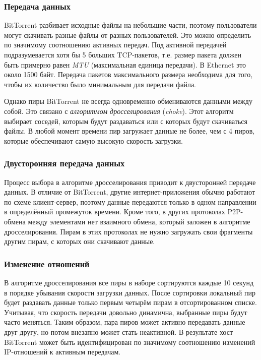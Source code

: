 \documentclass[bachelor, och, coursework]{SCWorks}
\begin{document}
\subsubsection{Передача данных}
BitTorrent разбивает исходные файлы на небольшие части, поэтому пользователи могут скачивать разные файлы
от разных пользователей. Это можно определить по значимому соотношению активных передач. Под активной передачей
подразумевается хотя бы 5 больших TCP-пакетов, т.е. размер пакета должен быть примерно равен \textit{MTU} (максимальная единица передачи). В Ethernet это около 1500 байт. Передача пакетов максимального размера необходима для того, 
чтобы их количество было минимальным для передачи файла.

Однако пиры BitTorrent не всегда одновременно обмениваются данными между собой. 
Это связано с \textit{алгоритмом дросселирования} (\textit{choke}). Этот алгоритм выбирает соседей, которым будут раздаваться или с которых будут скачиваться файлы. В любой момент времени пир загружает данные не более, чем 
с 4 пиров, которые обеспечивают самую высокую скорость загрузки. %
 
\subsubsection{Двусторонняя передача данных}
Процесс выбора в алгоритме дросселирования приводит к двусторонней передаче данных. В отличие от BitTorrent, другие 
интернет-приложения обычно работают по схеме клиент-сервер, поэтому данные передаются только в одном направлении в 
определённый промежуток времени. Кроме того, в других протоколах P2P-обмена между элементами нет взаимного обмена,
который заложен в алгоритме дросселирования. Пирам в этих протоколах не нужно загружать свои фрагменты другим пирам,
с которых они скачивают данные. 

\subsubsection{Изменение отношений}
В алгоритме дросселирования все пиры в наборе сортируются каждые 10 секунд в порядке убывания скорости загрузки данных.
После сортировки локальный пир будет раздавать данные только первым четырём пирам в отсортированном списке.
Учитывая, что скорость передачи довольно динамична, выбранные пиры будут часто меняться. Таким образом, пара пиров
может активно передавать данные друг другу, но потом внезапно может стать неактивной. В результате хост BitTorrent может
быть идентифицирован по значимому соотношению изменений IP-отношений к активным передачам.
\end{document}
